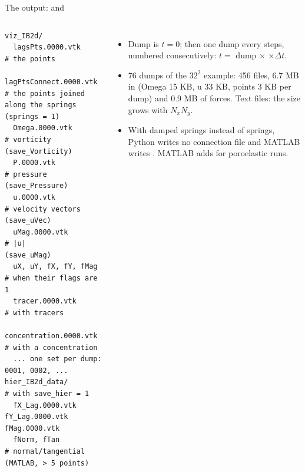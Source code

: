 \documentclass[aspectratio=169,11pt]{beamer}
\begin{document}
\begin{frame}[fragile]{The output:  and }
\label{fr:output}
\begin{columns}[T]
\begin{lstlisting}[style=plain]
viz_IB2d/
  lagsPts.0000.vtk        # the points
  lagPtsConnect.0000.vtk  # the points joined along the springs (springs = 1)
  Omega.0000.vtk          # vorticity          (save_Vorticity)
  P.0000.vtk              # pressure           (save_Pressure)
  u.0000.vtk              # velocity vectors   (save_uVec)
  uMag.0000.vtk           # |u|                (save_uMag)
  uX, uY, fX, fY, fMag    # when their flags are 1
  tracer.0000.vtk         # with tracers
  concentration.0000.vtk  # with a concentration
  ... one set per dump: 0001, 0002, ...
hier_IB2d_data/           # with save_hier = 1
  fX_Lag.0000.vtk  fY_Lag.0000.vtk  fMag.0000.vtk
  fNorm, fTan             # normal/tangential (MATLAB, > 5 points)
\end{lstlisting}
\small
\begin{itemize}
  \item Dump  is $t = 0$; then one dump every  steps, numbered consecutively: $t = $ dump $\times$  $\times \Delta t$.
  \item 76 dumps of the $32^2$ example: 456 files, 6.7 MB in  (Omega 15 KB, u 33 KB, points 3 KB per dump) and 0.9 MB of forces. Text files: the size grows with $N_x N_y$.
  \item With damped springs instead of springs, Python writes no connection file and MATLAB writes . MATLAB adds  for poroelastic runs.
\end{itemize}
\end{columns}
\end{frame}
\end{document}
